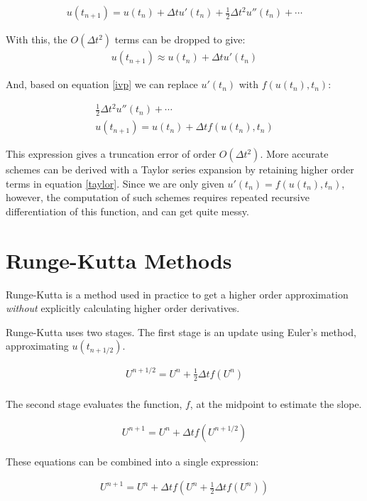 \documentclass[12pt]{article}
\begin{document}
\begin{align}
u(t_{n+1}) = u(t_n) + \Delta tu'(t_n) + \frac{1}{2}\Delta t^2u''(t_n) + \cdots
\label{taylor}
\end{align}

With this, the $O(\Delta t^2)$ terms can be dropped to give:
\begin{align}
u(t_{n+1}) \approx u(t_n) + \Delta tu'(t_n) 
\end{align}

And, based on equation \eqref{ivp} we can replace $u'(t_n)$ with 
$f(u(t_n),t_n)$:

\begin{align}
\frac{1}{2}\Delta t^2u''(t_n) + \cdots\\
u(t_{n+1}) = u(t_n) + \Delta tf(u(t_n),t_n)
\end{align}

This expression gives a truncation error of order $O(\Delta t^2)$. More 
accurate schemes can be derived with a Taylor series expansion by retaining 
higher order terms in equation \eqref{taylor}. Since we are only given 
$u'(t_n) = f(u(t_n),t_n)$, however, the computation of such schemes requires 
repeated recursive differentiation of this function, and can get quite messy.


\section{Runge-Kutta Methods}

Runge-Kutta is a method used in practice to get a higher order approximation 
\emph{without} explicitly calculating higher order derivatives.

Runge-Kutta uses two stages. The first stage is an update using Euler's method, 
approximating $u(t_{n+1/2})$. 

\begin{align}
U^{n+1/2} = U^n + \frac{1}{2}\Delta tf(U^n)\\
\end{align}

The second stage evaluates the function, $f$, at the midpoint to estimate the 
slope.

\begin{align}
U^{n+1} = U^n + \Delta tf(U^{n+1/2})
\end{align}

These equations can be combined into a single expression:

\begin{align}
U^{n+1} = U^n + \Delta tf(U^n + \frac{1}{2}\Delta tf(U^n))
\end{align}
\end{document}
